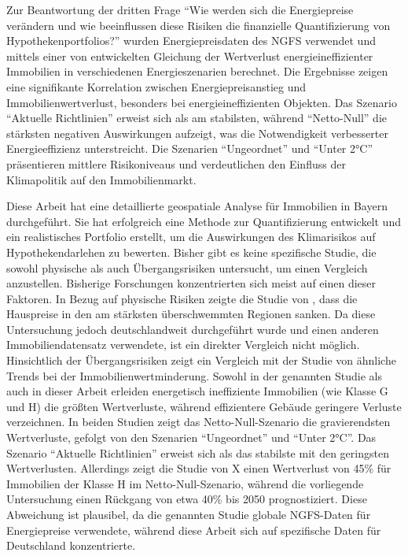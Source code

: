 Zur Beantwortung der dritten Frage \enquote{Wie werden sich die Energiepreise verändern und wie beeinflussen diese Risiken die finanzielle Quantifizierung von Hypothekenportfolios?} wurden Energiepreisdaten des NGFS verwendet und mittels einer von \textcite{tergerman} entwickelten Gleichung der Wertverlust energieineffizienter Immobilien in verschiedenen Energieszenarien berechnet. Die Ergebnisse zeigen eine signifikante Korrelation zwischen Energiepreisanstieg und Immobilienwertverlust, besonders bei energieineffizienten Objekten. Das Szenario \enquote{Aktuelle Richtlinien} erweist sich als am stabilsten, während \enquote{Netto-Null} die stärksten negativen Auswirkungen aufzeigt, was die Notwendigkeit verbesserter Energieeffizienz unterstreicht. Die Szenarien \enquote{Ungeordnet} und \enquote{Unter 2°C} präsentieren mittlere Risikoniveaus und verdeutlichen den Einfluss der Klimapolitik auf den Immobilienmarkt.

Diese Arbeit hat eine detaillierte geospatiale Analyse für Immobilien in Bayern durchgeführt. Sie hat erfolgreich eine Methode zur Quantifizierung entwickelt und ein realistisches Portfolio erstellt, um die Auswirkungen des Klimarisikos auf Hypothekendarlehen zu bewerten.  Bisher gibt es keine spezifische Studie, die sowohl physische als auch Übergangsrisiken untersucht, um einen Vergleich anzustellen. Bisherige Forschungen konzentrierten sich meist auf einen dieser Faktoren. In Bezug auf physische Risiken zeigte die Studie von \textcite{moore2022flood}, dass die Hauspreise in den am stärksten überschwemmten Regionen sanken. Da diese Untersuchung jedoch deutschlandweit durchgeführt wurde und einen anderen Immobiliendatensatz verwendete, ist ein direkter Vergleich nicht möglich. Hinsichtlich der Übergangsrisiken zeigt ein Vergleich mit der Studie von \textcite{tergerman} ähnliche Trends bei der Immobilienwertminderung. Sowohl in der genannten Studie als auch in dieser Arbeit erleiden energetisch ineffiziente Immobilien (wie Klasse G und H) die größten Wertverluste, während effizientere Gebäude geringere Verluste verzeichnen. In beiden Studien zeigt das Netto-Null-Szenario die gravierendsten Wertverluste, gefolgt von den Szenarien \enquote{Ungeordnet} und \enquote{Unter 2°C}. Das Szenario \enquote{Aktuelle Richtlinien} erweist sich als das stabilste mit den geringsten Wertverlusten. Allerdings zeigt die Studie von X einen Wertverlust von 45\% für Immobilien der Klasse H im Netto-Null-Szenario, während die vorliegende Untersuchung einen Rückgang von etwa 40\% bis 2050 prognostiziert. Diese Abweichung ist plausibel, da die genannten Studie globale NGFS-Daten für Energiepreise verwendete, während diese Arbeit sich auf spezifische Daten für Deutschland konzentrierte.

